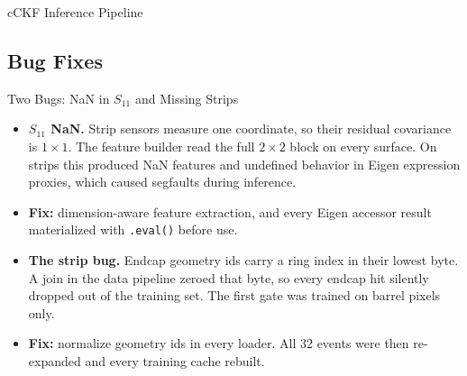 \documentclass[aspectratio=169]{beamer}
\begin{document}
\begin{frame}{cCKF Inference Pipeline}
{
}%
\end{frame}

\subsection{Bug Fixes}

\begin{frame}{Two Bugs: NaN in $S_{11}$ and Missing Strips}
  \begin{itemize}
    \item \textbf{$S_{11}$ NaN.} Strip sensors measure one coordinate, so their
      residual covariance is $1\times1$. The feature builder read the full
      $2\times2$ block on every surface. On strips this produced NaN features
      and undefined behavior in Eigen expression proxies, which caused
      segfaults during inference.
    \item \textbf{Fix:} dimension-aware feature extraction, and every Eigen
      accessor result materialized with \texttt{.eval()} before use.
    \item \textbf{The strip bug.} Endcap geometry ids carry a ring index in
      their lowest byte. A join in the data pipeline zeroed that byte, so every
      endcap hit silently dropped out of the training set. The first gate was
      trained on barrel pixels only.
    \item \textbf{Fix:} normalize geometry ids in every loader. All 32 events
      were then re-expanded and every training cache rebuilt.
  \end{itemize}
\end{frame}
\end{document}
